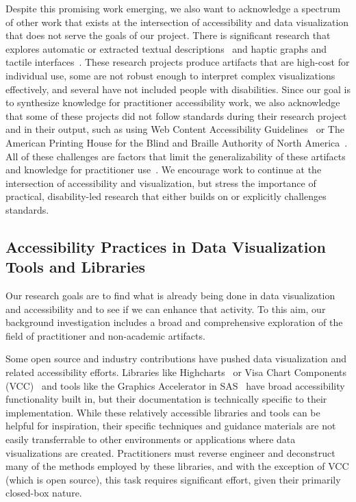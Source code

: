 \documentclass{egpubl}
\begin{document}
Despite this promising work emerging, we also want to acknowledge a spectrum of other work that exists at the intersection of accessibility and data visualization that does not serve the goals of our project. There is significant research that explores automatic or extracted textual descriptions~\cite{choi_visualizing_2019,balaji_chart-text_2018,chen_neural_2019,chen_figure_2020,lai_automatic_2020,obeid_chart--text_2020,qian_generating_2021,sharif_evographs_2018} and haptic graphs and tactile interfaces~\cite{aldrich_talk_2008,bornschein_collaborative_2015, brown_viztouch_2012,butler_technology_2021,gallace_what_2011,geldard_tactual_1983,jansen_opportunities_2015,jayant_automated_2007,lederman_perception_1986,schneider_constructing_nodate,shi_tickers_2016,baker_2016}. These research projects produce artifacts that are high-cost for individual use, some are not robust enough to interpret complex visualizations effectively, and several have not included people with disabilities. Since our goal is to synthesize knowledge for practitioner accessibility work, we also acknowledge that some of these projects did not follow standards during their research project and in their output, such as using Web Content Accessibility Guidelines~\cite{noauthor_web_nodate} or The American Printing House for the Blind and Braille Authority of North America~\cite{noauthor_guidelines_nodate}. All of these challenges are factors that limit the generalizability of these artifacts and knowledge for practitioner use~\cite{lundgard_sociotechnical_2019,moraes_evaluating_2014,sharif_understanding_2021}. We encourage work to continue at the intersection of accessibility and visualization, but stress the importance of practical, disability-led research that either builds on or explicitly challenges standards.

\subsection{Accessibility Practices in Data Visualization Tools and Libraries}
Our research goals are to find what is already being done in data visualization and accessibility and to see if we can enhance that activity. To this aim, our background investigation includes a broad and comprehensive exploration of the field of practitioner and non-academic artifacts.

Some open source and industry contributions have pushed data visualization and related accessibility efforts. Libraries like Highcharts~\cite{noauthor_accessibility_nodate} or Visa Chart Components (VCC)~\cite{vcc} and tools like the Graphics Accelerator in SAS~\cite{noauthor_sas_nodate} have broad accessibility functionality built in, but their documentation is technically specific to their implementation. While these relatively accessible libraries and tools can be helpful for inspiration, their specific techniques and guidance materials are not easily transferrable to other environments or applications where data visualizations are created. Practitioners must reverse engineer and deconstruct many of the methods employed by these libraries, and with the exception of VCC (which is open source), this task requires significant effort, given their primarily closed-box nature. 
\end{document}
